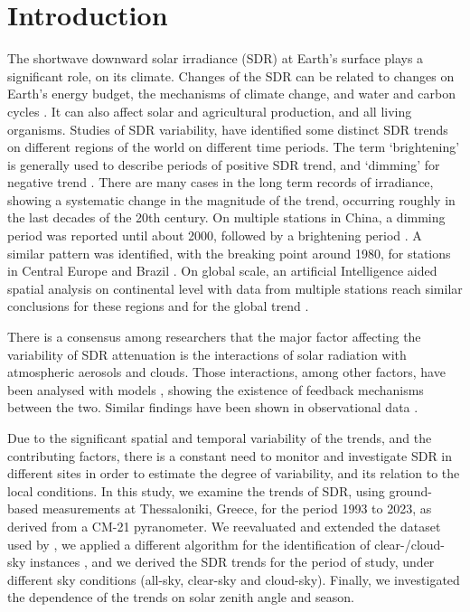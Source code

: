 \documentclass[applsci,article,submit,moreauthors,pdftex]{Definitions/mdpi}
\begin{document}

\hypertarget{introduction}{%
\section{Introduction}\label{introduction}}

The shortwave downward solar irradiance (SDR) at Earth's surface plays a
significant role, on its climate. Changes of the SDR can be related to
changes on Earth's energy budget, the mechanisms of climate change, and
water and carbon cycles \citep{Wild2009}. It can also affect solar and
agricultural production, and all living organisms. Studies of SDR
variability, have identified some distinct SDR trends on different
regions of the world on different time periods. The term `brightening'
is generally used to describe periods of positive SDR trend, and
`dimming' for negative trend \citep{Wild2009}. There are many cases in
the long term records of irradiance, showing a systematic change in the
magnitude of the trend, occurring roughly in the last decades of the
20th century. On multiple stations in China, a dimming period was
reported until about 2000, followed by a brightening period
\citep{Yang2021}. A similar pattern was identified, with the breaking
point around 1980, for stations in Central Europe \citep{Wild2021} and
Brazil \citep{Yamasoe2021}. On global scale, an artificial Intelligence
aided spatial analysis on continental level with data from multiple
stations reach similar conclusions for these regions and for the global
trend \citep{Yuan2021}.

There is a consensus among researchers that the major factor affecting
the variability of SDR attenuation is the interactions of solar
radiation with atmospheric aerosols and clouds. Those interactions,
among other factors, have been analysed with models
\citep{Li2016, Samset2018}, showing the existence of feedback mechanisms
between the two. Similar findings have been shown in observational data
\citep[ and references
therein]{Schwarz2020, Ohvril2009, Zerefos2009, Xia2007}.

Due to the significant spatial and temporal variability of the trends,
and the contributing factors, there is a constant need to monitor and
investigate SDR in different sites in order to estimate the degree of
variability, and its relation to the local conditions. In this study, we
examine the trends of SDR, using ground-based measurements at
Thessaloniki, Greece, for the period 1993 to 2023, as derived from a
CM-21 pyranometer. We reevaluated and extended the dataset used by
\citet{Bais2013}, we applied a different algorithm for the
identification of clear-/cloud-sky instances
\citep{Reno2016, Reno2012a}, and we derived the SDR trends for the
period of study, under different sky conditions (all-sky, clear-sky and
cloud-sky). Finally, we investigated the dependence of the trends on
solar zenith angle and season.
\end{document}
